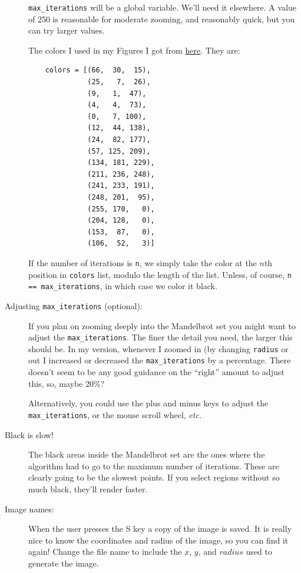 \documentclass[12pt]{article}
\begin{document}
\begin{description}
\lstinline{max_iterations} will be a global
variable.  We'll need it elsewhere.   A value of
250 is reasonable for moderate zooming, and reasonably
quick, 
but you can try larger values. 

The colors I used in my Figures I got from 
\href{https://stackoverflow.com/questions/16500656/which-color-gradient-is-used-to-color-mandelbrot-in-wikipedia}{here}.
They are:
\begin{lstlisting}
    colors = [(66,  30,  15),
              (25,   7,  26),
              (9,   1,  47),
              (4,   4,  73),
              (0,   7, 100),
              (12,  44, 138),
              (24,  82, 177),
              (57, 125, 209),
              (134, 181, 229),
              (211, 236, 248),
              (241, 233, 191),
              (248, 201,  95),
              (255, 170,   0),
              (204, 128,   0),
              (153,  87,   0),
              (106,  52,   3)]
\end{lstlisting}
If the number of iterations is \lstinline{n},
we simply take the color at the $n$th
position in \lstinline{colors} list, modulo the length of
the list.
Unless, of course, \lstinline{n == max_iterations},
in which case we color it black.

\item[Adjusting {\tt max\_iterations} (optional):]
If you plan on zooming deeply into the Mandelbrot
set you might want to adjust the \lstinline{max_iterations}.
The finer the detail you need, the larger this should
be.  In my version, whenever I zoomed in (by
changing \lstinline{radius} or out I increased
or decreased the \lstinline{max_iterations} by
a percentage.  There doesn't seem to be any 
good guidance on the ``right'' amount to adjust
this, so, maybe 20\%?

Alternatively, you could use the plus and minus keys
to adjust the \lstinline{max_iterations}, or the
mouse scroll wheel, {\em etc.}

\item[Black is slow!]  The black areas inside
the Mandelbrot set are the ones where the algorithm
had to go to the maximum number of iterations.
These are clearly going to be the slowest points.
If you select regions without so much black,
they'll render faster.

\item[Image names:] When the user presses the S
key a copy of the image is saved.  It is really nice
to know the coordinates and radius of the image,
so you can find it again!  Change the file name
to include the $x$, $y$, and $radius$ used to generate
the image.  


\end{description}
\end{document}

